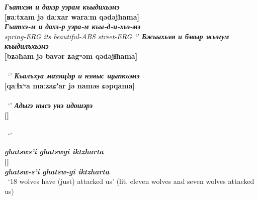 \documentclass[a4paper,12pt]{book}
\newcommand{\1}[1]{\textbf{\emph{#1}}} %
\newcommand{\2}[1]{\textbf{[#1]}} %
\newcommand{\3}[1]{\fontsize{11pt}{0cm}\textbf{\emph{#1}}} %
\newcommand{\4}[1]{\fontsize{10pt}{0cm}\emph{#1}}	%
\newcommand{\5}[1]{\textbf{/#1/}} %
\newcommand{\6}[1]{\textbf{[#1]}} %
\newcommand{\7}[1]{\fontsize{12pt}{0cm}\emph{#1}} %
\newcommand{\8}[1]{\fontsize{12pt}{0cm}`#1'} %
\newcommand{\9}[1]{\fontsize{12pt}{0cm}(lit. `#1')} %
\begin{document}
\begin{exe}
\ex
\1{Гъатхэм и дахэр уэрам къыдихьэмэ}\\
\2{ʁaːtxam jə daːxar waraːm qədəjħama}\\
\3{Гъатхэ-м и дахэ-р уэра-м къы-д-и-хьэ-мэ}\\
\4{spring-ERG its beautiful-ABS street-ERG}\
\trans \8{}
\ex
\1{Бжьыхьэм и бэвыр жьэгум къыдилъхьэмэ}\\
\2{bʑəħam jə bavər ʑagʷəm qədəjɬħama}\\
\3{}\\
\4{}\
\trans \8{}
\ex
\1{Къалъхуа мазэщlэр и нэмыс щыпкъэмэ}\\
\2{qaːɬxʷa maːzaɕʼar jə naməs ɕəpqama}\\
\3{}\\
\4{}\
\trans \8{}
\ex
\1{Адыгэ нысэ унэ идошэрэ}\\
\2{}\\
\3{}\\
\4{}\
\trans \8{}

\end{exe}




\begin{exe}
\ex
\1{ghatsws'i ghatswgi iktzharta}\\
\2{}\\
\3{ghatsw-s'i ghatsw-gi iktzharta}\\
\4{}\
\trans \8{18 wolves have (just) attacked us} (lit. eleven wolves and seven wolves attacked us)
\end{exe}
\end{document}
